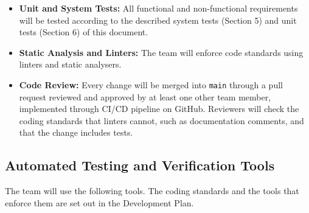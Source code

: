 \documentclass[12pt]{article}
\begin{document}
\begin{itemize}
  \item \textbf{Unit and System Tests: } All functional and non-functional requirements will be 
  tested according to the described system tests (Section 5) and unit tests (Section 6) of this document. 
  \item \textbf{Static Analysis and Linters: } The team will enforce code standards using linters and static analysers.
  \item \textbf{Code Review: } Every change will be merged into \texttt{main} through a pull request reviewed
  and approved by at least one other team member, implemented through CI/CD pipeline on GitHub. Reviewers will check the coding standards that linters cannot, 
  such as documentation comments, and that the change includes tests.
\end{itemize}

\subsection{Automated Testing and Verification Tools}




The team will use the following tools. The coding standards and the tools that enforce them are set out in the
Development Plan.
\end{document}
